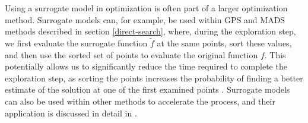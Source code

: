 Using a surrogate model in optimization is often part of a larger optimization method. Surrogate models can, for example, be used within GPS and MADS methods described in section \ref{direct-search}, where, during the exploration step, we first evaluate the surrogate function \( \tilde{f} \) at the same points, sort these values, and then use the sorted set of points to evaluate the original function \( f \). This potentially allows us to significantly reduce the time required to complete the exploration step, as sorting the points increases the probability of finding a better estimate of the solution at one of the first examined points \cite{BBO-textbook}. Surrogate models can also be used within other methods to accelerate the process, and their application is discussed in detail in \cite{two-decades, BBO-textbook}.
